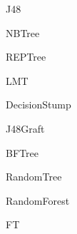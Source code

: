 \documentclass[
	handout,
  	aspectratio=169
]{beamer}
\begin{document}
		\begin{frame}{J48}		
		\end{frame}

		\begin{frame}{NBTree}		
		\end{frame}

		\begin{frame}{REPTree}		
		\end{frame}

		\begin{frame}{LMT}		
		\end{frame}

		\begin{frame}{DecisionStump}		
		\end{frame}

		\begin{frame}{J48Graft}		
		\end{frame}

		\begin{frame}{BFTree}		
		\end{frame}

		\begin{frame}{RandomTree}		
		\end{frame}

		\begin{frame}{RandomForest}		
		\end{frame}

		\begin{frame}{FT}		
		\end{frame}
\end{document}
